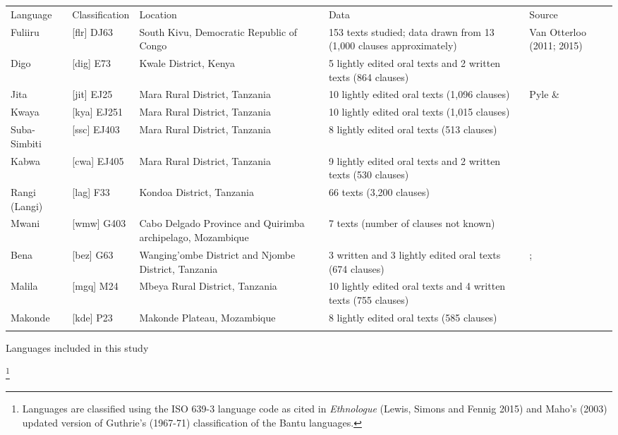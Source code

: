 \documentclass[output=paper]{langsci/langscibook}
\begin{document}
\begin{tabular}{lllll}
\lsptoprule
 Language & Classification & Location & Data & Source\\
 Fuliiru & [flr] DJ63 & South Kivu, Democratic Republic of Congo & 153 texts studied; data drawn from 13 (1,000 clauses approximately) & Van Otterloo (2011; 2015)\\
 Digo & [dig] E73 & Kwale District, Kenya & 5 lightly edited oral texts and 2 written texts (864 clauses) & \citet{Nicolle2015a}\\
 Jita & [jit] EJ25 & Mara Rural District, Tanzania & 10 lightly edited oral texts (1,096 clauses) & Pyle \& \citet{Robinson2015}\\
 Kwaya & [kya] EJ251 & Mara Rural District, Tanzania & 10 lightly edited oral texts (1,015 clauses) & \citet{Odom2015}\\
 Suba-Simbiti & [ssc] EJ403 & Mara Rural District, Tanzania & 8 lightly edited oral texts (513 clauses) & \citet{Masatu2015}\\
 Kabwa & [cwa] EJ405 & Mara Rural District, Tanzania & 9 lightly edited oral texts and 2 written texts (530 clauses) & \citet{Walker2011}\\
 Rangi (Langi) & [lag] F33 & Kondoa District, Tanzania & 66 texts (3,200 clauses) & \citet{Stegen2011}\\
 Mwani & [wmw] G403 & Cabo Delgado Province and Quirimba archipelago, Mozambique & 7 texts (number of clauses not known) & \citet{Floor2005}\\
 Bena & [bez] G63 & Wanging’ombe District and Njombe District, Tanzania & 3 written and 3 lightly edited oral texts (674 clauses) & \citet{Broomhall2011}; \citet{Eaton2015a}\\
 Malila & [mgq] M24 & Mbeya Rural District, Tanzania & 10 lightly edited oral texts and 4 written texts (755 clauses) & \citet{Eaton2015b}\\
 Makonde & [kde] P23 & Makonde Plateau, Mozambique & 8 lightly edited oral texts (585 clauses) & \citet{Leach2015}\\
\lspbottomrule
\end{tabular}
\begin{table}
\caption{Languages included in this study}
\footnote{Languages are classified using the ISO 639-3 language code as cited in \textit{Ethnologue} (Lewis, Simons and Fennig 2015) and Maho’s (2003) updated version of Guthrie’s (1967-71) classification of the Bantu languages.}
\label{tab:1}
\end{table}
\end{document}
